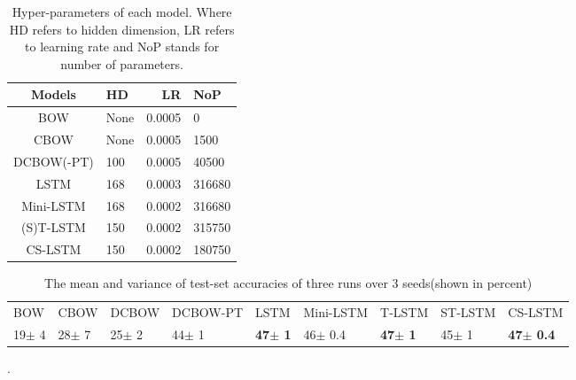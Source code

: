 \begin{table}[t!]
    \begin{center}
    \small
    \begin{tabular}{|c|l|r|l|}
        \hline \bf Models & \bf HD & \bf LR &\bf NoP \\ \hline
        BOW & None & 0.0005 &0\\
        CBOW & None & 0.0005 & 1500\\
        DCBOW(-PT)& 100 & 0.0005 &40500\\
        LSTM&168 & 0.0003 &316680\\
        Mini-LSTM&168 & 0.0002&316680\\
        (S)T-LSTM&150 & 0.0002&315750\\
        CS-LSTM&150 & 0.0002& 180750\\
        \hline
    \end{tabular}
    \end{center}
    \caption{Hyper-parameters of each model. Where HD refers to hidden dimension, LR refers to learning rate and NoP stands for number of parameters.}
    \label{tab:parameters}
\end{table}

\begin{table*}[t]
    \centering
    \small
    \begin{tabular}{lllllllll}
    BOW  & CBOW & DCBOW & DCBOW-PT & LSTM & Mini-LSTM & T-LSTM & ST-LSTM &CS-LSTM \\
    19$\pm$ 4 & 28$\pm$ 7 & 25$\pm$ 2 & 44$\pm$ 1 & \textbf{47$\pm$ 1} & 46$\pm$ 0.4 & \textbf{47$\pm$ 1} & 45$\pm$ 1& \textbf{47$\pm$ 0.4}
\end{tabular}
\caption{The mean and variance of test-set accuracies of three runs over 3 seeds(shown in percent)}.
\label{table: results-acc}
\end{table*}



